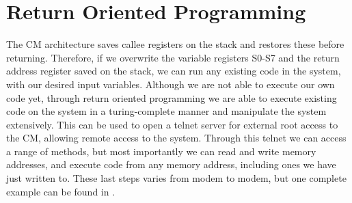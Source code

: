 \section{Return Oriented Programming}
The CM architecture saves callee registers on the stack and restores these before returning. 
Therefore, if we overwrite the variable registers S0-S7 and the return address register saved on the stack, we can run any existing code in the system, with our desired input variables.
Although we are not able to execute our own code yet, through return oriented programming we are able to execute existing code on the system in a turing-complete manner and manipulate the system extensively.
This can be used to open a telnet server for external root access to the CM, allowing remote access to the system.
Through this telnet we can access a range of methods, but most importantly we can read and write memory addresses, and execute code from any memory address, including ones we have just written to.
These last steps varies from modem to modem, but one complete example can be found in .

